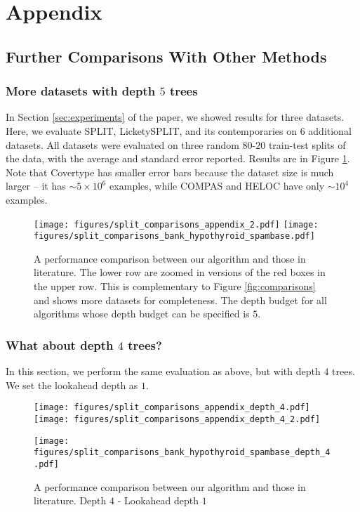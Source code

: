 \section{Appendix}

\subsection{Further Comparisons With Other Methods}
\subsubsection{More datasets with depth $5$ trees}
In Section \ref{sec:experiments} of the paper, we showed results for three datasets. Here, we evaluate SPLIT, LicketySPLIT, and its contemporaries on $6$ additional datasets. All datasets were evaluated on three random $80$-$20$ train-test splits of the data, with the average and standard error reported. Results are in Figure \ref{fig:comparisons_2}. Note that Covertype has smaller error bars because the dataset size is much larger -- it has $\sim5\times 10^6$ examples, while COMPAS and HELOC have only $\sim10^4$ examples.
\begin{figure}[H]
    \centering
        \centering
    \texttt{[image: figures/split\_comparisons\_appendix\_2.pdf]}
    \texttt{[image: figures/split\_comparisons\_bank\_hypothyroid\_spambase.pdf]}
    \caption{A performance comparison between our algorithm and those in literature. The lower row are zoomed in versions of the red boxes in the upper row. This is complementary to Figure \ref{fig:comparisons} and shows more datasets for completeness. The depth budget for all algorithms whose depth budget can be specified is $5$.}
    \label{fig:comparisons_2}
\end{figure}
\subsubsection{What about depth $4$ trees?}
In this section, we perform the same evaluation as above, but with depth $4$ trees. We set the lookahead depth as $1$. 
\begin{figure}[H]
    \centering
    \texttt{[image: figures/split\_comparisons\_appendix\_depth\_4.pdf]}
    \texttt{[image: figures/split\_comparisons\_appendix\_depth\_4\_2.pdf]}
\end{figure}
\begin{figure}[H]
    \centering
    \texttt{[image: figures/split\_comparisons\_bank\_hypothyroid\_spambase\_depth\_4.pdf]}
    \caption{A performance comparison between our algorithm and those in literature. Depth $4$ - Lookahead depth $1$}
    \label{fig:split_comparisons_appendix_depth_4}
\end{figure}

